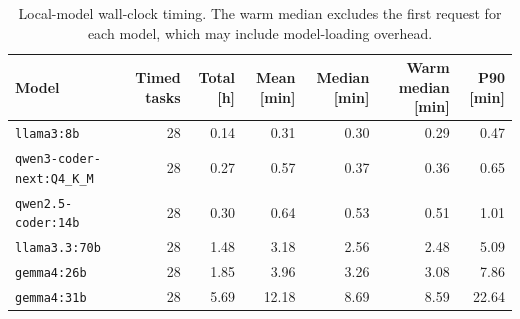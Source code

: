 \begin{table}[t]
\centering
\small
\caption{Local-model wall-clock timing. The warm median excludes the first
request for each model, which may include model-loading overhead.}
\label{tab:local-runtime-summary}
\begin{tabular}{lrrrrrr}
\toprule
Model & Timed tasks & Total [h] & Mean [min] & Median [min] &
Warm median [min] & P90 [min] \\
\midrule
\texttt{llama3:8b} & 28 & 0.14 & 0.31 & 0.30 & 0.29 & 0.47 \\
\texttt{qwen3-coder-next:Q4\_K\_M} & 28 & 0.27 & 0.57 & 0.37 & 0.36 & 0.65 \\
\texttt{qwen2.5-coder:14b} & 28 & 0.30 & 0.64 & 0.53 & 0.51 & 1.01 \\
\texttt{llama3.3:70b} & 28 & 1.48 & 3.18 & 2.56 & 2.48 & 5.09 \\
\texttt{gemma4:26b} & 28 & 1.85 & 3.96 & 3.26 & 3.08 & 7.86 \\
\texttt{gemma4:31b} & 28 & 5.69 & 12.18 & 8.69 & 8.59 & 22.64 \\
\bottomrule
\end{tabular}
\end{table}

